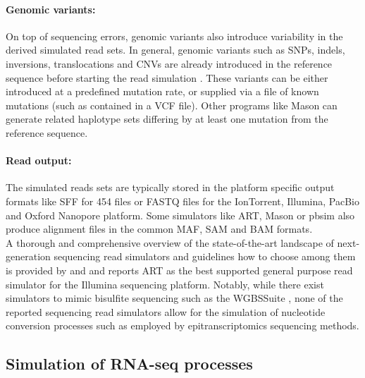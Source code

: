 \paragraph{Genomic variants:} On top of sequencing errors, genomic variants also introduce variability in the derived simulated read sets. In general, genomic variants such as SNPs, indels, inversions, translocations and CNVs are already introduced in the reference sequence before starting the read simulation \citep{Pattnaik2014}. These variants can be either introduced at a predefined mutation rate, or supplied via a file of known mutations (such as contained in a VCF file). Other programs like Mason can generate related haplotype sets differing by at least one mutation from the reference sequence. 

\paragraph{Read output:} The simulated reads sets are typically stored in the platform specific output formats like SFF for 454 files or FASTQ files for the IonTorrent, Illumina, PacBio and Oxford Nanopore platform. Some simulators like ART, Mason or pbsim also produce alignment files in the common MAF, SAM and BAM formats.
\\ 

A thorough and comprehensive overview of the state-of-the-art landscape of next-generation sequencing read simulators and guidelines how to choose among them is provided by \citeauthor{Escalona2016} \citep{Escalona2016} and \citeauthor{Zhao2017} \citep{Zhao2017} and reports ART \citep{Huang2012} as the best supported general purpose read simulator for the Illumina sequencing platform. Notably, while there exist simulators to mimic bisulfite sequencing such as the WGBSSuite \citep{Rackham2015}, none of the reported sequencing read simulators allow for the simulation of nucleotide conversion processes such as employed by epitranscriptomics sequencing methods.

\subsection{Simulation of RNA-seq processes}

